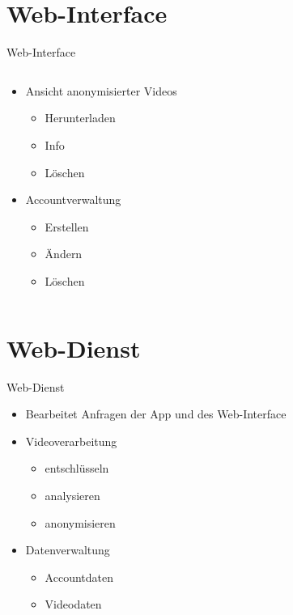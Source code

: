\documentclass[19pt]{beamer}
\begin{document}
\section{Web-Interface}
\begin{frame}{Web-Interface}
  \begin{columns}[T]
    \begin{column}{.5\textwidth}
    		\begin{itemize}
    			\item Ansicht anonymisierter Videos
    			\begin{itemize}
					\item Herunterladen
					\item Info
					\item L\"oschen
				\end{itemize}
				\pause
    			\item Accountverwaltung
    			\begin{itemize}
					\item Erstellen
					\item \"Andern
					\item L\"oschen
				\end{itemize}
    		\end{itemize}
    \end{column}
    \begin{column}{.5\textwidth}
    \end{column}
  \end{columns}
\end{frame}

\section{Web-Dienst}
\begin{frame}{Web-Dienst}
	\begin{itemize}
		\item Bearbeitet Anfragen der App und des Web-Interface
		\pause
		\item Videoverarbeitung
			\begin{itemize}
				\item entschl\"usseln
				\item analysieren
				\item anonymisieren
			\end{itemize}
		\pause
		\item Datenverwaltung
			\begin{itemize}
				\item Accountdaten
				\item Videodaten
			\end{itemize}
	\end{itemize}
\end{frame}
\end{document}
